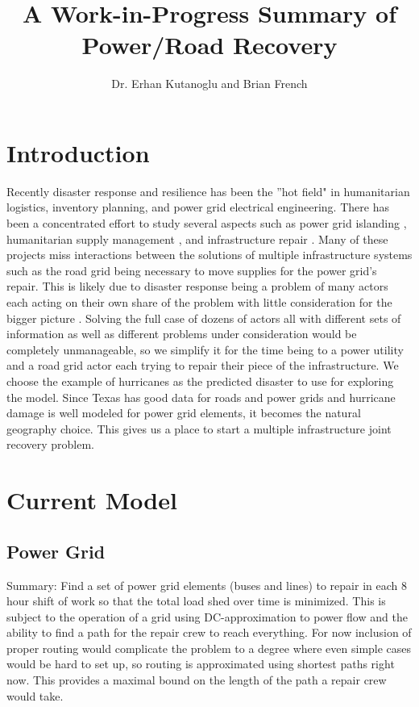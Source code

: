 \documentclass{article}
\begin{document}
\title{A Work-in-Progress Summary of Power/Road Recovery}
\author{Dr. Erhan Kutanoglu and Brian French}
\maketitle

	\section{Introduction}
	Recently disaster response and resilience has been the ''hot field" in humanitarian logistics, inventory planning, and power grid electrical engineering. There has been a concentrated effort to study several aspects such as power grid islanding \cite{PanteliEA2016, DeepjyotiEA2018}, humanitarian supply management \cite{JiangEA2012, CaunhyeEA2012}, and infrastructure repair \cite{AksuEA2014}. Many of these projects miss interactions between the solutions of multiple infrastructure systems such as the road grid being necessary to move supplies for the power grid's repair. This is likely due to disaster response being a problem of many actors each acting on their own share of the problem with little consideration for the bigger picture \cite{VerasEA2012} . Solving the full case of dozens of actors all with different sets of information as well as different problems under consideration would be completely unmanageable, so we simplify it for the time being to a power utility and a road grid actor each trying to repair their piece of the infrastructure. We choose the example of hurricanes as the predicted disaster to use for exploring the model. Since Texas has good data for roads and power grids and hurricane damage is well modeled for power grid elements, it becomes the natural geography choice. \cite{GuikemaEA2010} This gives us a place to start a multiple infrastructure joint recovery problem.
	
	\section{Current Model}
	\subsection{Power Grid}
	Summary: Find a set of power grid elements (buses and lines) to repair in each 8 hour shift of work so that the total load shed over time is minimized. This is subject to the operation of a grid using DC-approximation to power flow and the ability to find a path for the repair crew to reach everything. For now inclusion of proper routing would complicate the problem to a degree where even simple cases would be hard to set up, so routing is approximated using shortest paths right now. This provides a maximal bound on the length of the path a repair crew would take. 
	
\end{document}
